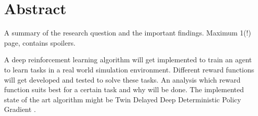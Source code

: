 \chapter*{Abstract}

A summary of the research question and the important findings.
Maximum 1(!) page, contains spoilers. 

A deep reinforcement learning algorithm will get implemented to train an agent to learn tasks in a real world simulation environment. 
Different reward functions will get developed and tested to solve these tasks.
An analysis which reward function suits best for a certain task and why will be done.
The implemented state of the art algorithm might be Twin Delayed Deep Deterministic Policy Gradient \cite{Fujimoto2018}.